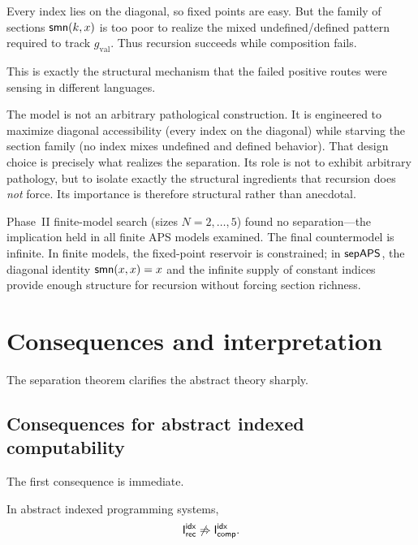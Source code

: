 \documentclass[11pt]{article}
\begin{document}
Every index lies on the diagonal, so fixed points are easy.  But the family of sections \(\mathsf{smn}(k,x)\) is too poor to realize the mixed undefined/defined pattern required to track \(g_{\mathrm{val}}\).  Thus recursion succeeds while composition fails.

This is exactly the structural mechanism that the failed positive routes were sensing in different languages.

\begin{remark}
The model is not an arbitrary pathological construction.  It is engineered to maximize diagonal accessibility (every index on the diagonal) while starving the section family (no index mixes undefined and defined behavior).  That design choice is precisely what realizes the separation.  Its role is not to exhibit arbitrary pathology, but to isolate exactly the structural ingredients that recursion does \emph{not} force.  Its importance is therefore structural rather than anecdotal.
\end{remark}

\begin{remark}
Phase~II finite-model search (sizes \(N=2,\ldots,5\)) found no separation---the implication held in all finite APS models examined.  The final countermodel is infinite.  In finite models, the fixed-point reservoir is constrained; in \(\mathsf{sepAPS}\), the diagonal identity \(\mathsf{smn}(x,x)=x\) and the infinite supply of constant indices provide enough structure for recursion without forcing section richness.
\end{remark}

\section{Consequences and interpretation}\label{sec:consequences}

The separation theorem clarifies the abstract theory sharply.

\subsection{Consequences for abstract indexed computability}

The first consequence is immediate.

\begin{corollary}
In abstract indexed programming systems,
\[
\mathsf{I}_{\mathsf{rec}}^{\mathsf{idx}} \not\Rightarrow \mathsf{I}_{\mathsf{comp}}^{\mathsf{idx}}.
\]
\end{corollary}
\end{document}
